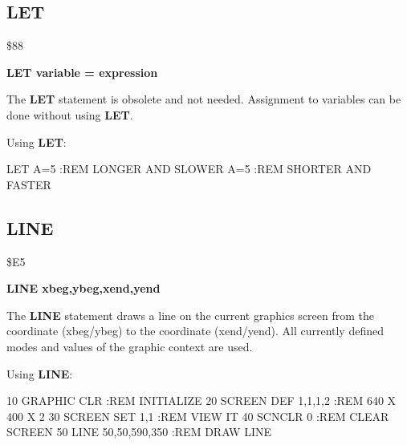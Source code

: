
\newpage
\subsection{LET}
\begin{description}[leftmargin=3cm,style=nextline]
\item [Token:] \$88
\item [Format:] {\bf LET variable = expression}
\item [Usage:] The {\bf LET} statement is obsolete and not needed.
               Assignment to variables can be done without using
               {\bf LET}.

\item [Example:] Using {\bf LET}:
\begin{screenoutput}
LET A=5  :REM LONGER  AND SLOWER
A=5      :REM SHORTER AND FASTER
\end{screenoutput}
\end{description}


\newpage
\subsection{LINE}
\begin{description}[leftmargin=3cm,style=nextline]
\item [Token:] \$E5
\item [Format:] {\bf LINE xbeg,ybeg,xend,yend}
\item [Usage:] The {\bf LINE} statement draws a line on the current
               graphics screen from the coordinate (xbeg/ybeg) to
               the coordinate (xend/yend). All currently defined
               modes and values of the graphic context are used.

\item [Example:] Using {\bf LINE}:
\begin{screenoutput}
 10 GRAPHIC CLR         :REM INITIALIZE
 20 SCREEN DEF 1,1,1,2  :REM 640 X 400 X 2
 30 SCREEN SET 1,1      :REM VIEW IT
 40 SCNCLR 0            :REM CLEAR SCREEN
 50 LINE 50,50,590,350  :REM DRAW LINE
\end{screenoutput}
\end{description}


\newpage
